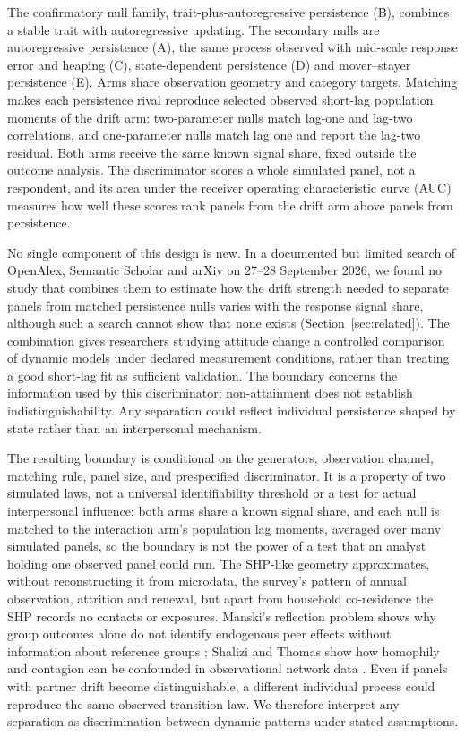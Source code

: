 The confirmatory null family, trait-plus-autoregressive persistence (B), combines a stable trait with autoregressive updating. The secondary nulls are autoregressive persistence (A), the same process observed with mid-scale response error and heaping (C), state-dependent persistence (D) and mover--stayer persistence (E). Arms share observation geometry and category targets. Matching makes each persistence rival reproduce selected observed short-lag population moments of the drift arm: two-parameter nulls match lag-one and lag-two correlations, and one-parameter nulls match lag one and report the lag-two residual. Both arms receive the same known signal share, fixed outside the outcome analysis. The discriminator scores a whole simulated panel, not a respondent, and its area under the receiver operating characteristic curve (AUC) measures how well these scores rank panels from the drift arm above panels from persistence.

No single component of this design is new. In a documented but limited search of OpenAlex, Semantic Scholar and arXiv on 27--28 September 2026, we found no study that combines them to estimate how the drift strength needed to separate panels from matched persistence nulls varies with the response signal share, although such a search cannot show that none exists (Section~\ref{sec:related}). The combination gives researchers studying attitude change a controlled comparison of dynamic models under declared measurement conditions, rather than treating a good short-lag fit as sufficient validation. The boundary concerns the information used by this discriminator; non-attainment does not establish indistinguishability. Any separation could reflect individual persistence shaped by state rather than an interpersonal mechanism.

The resulting boundary is conditional on the generators, observation channel, matching rule, panel size, and prespecified discriminator. It is a property of two simulated laws, not a universal identifiability threshold or a test for actual interpersonal influence: both arms share a known signal share, and each null is matched to the interaction arm's population lag moments, averaged over many simulated panels, so the boundary is not the power of a test that an analyst holding one observed panel could run. The SHP-like geometry approximates, without reconstructing it from microdata, the survey's pattern of annual observation, attrition and renewal, but apart from household co-residence the SHP records no contacts or exposures. Manski's reflection problem shows why group outcomes alone do not identify endogenous peer effects without information about reference groups \cite{manski1993}; Shalizi and Thomas show how homophily and contagion can be confounded in observational network data \cite{shalizi2011}. Even if panels with partner drift become distinguishable, a different individual process could reproduce the same observed transition law. We therefore interpret any separation as discrimination between dynamic patterns under stated assumptions.

